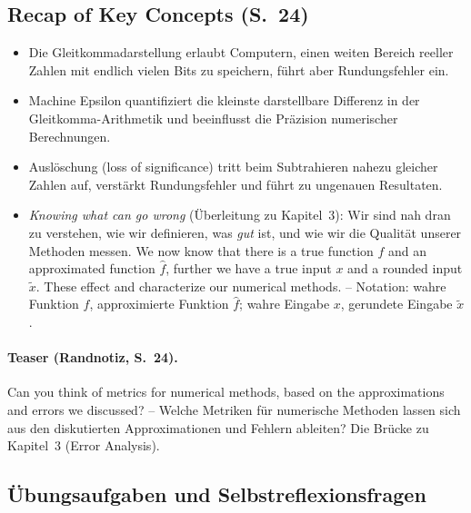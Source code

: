 \subsection{Recap of Key Concepts (S.~24)}

\begin{itemize}[itemsep=1pt]
  \item Die Gleitkommadarstellung erlaubt Computern, einen weiten Bereich reeller Zahlen mit endlich vielen Bits zu speichern, führt aber Rundungsfehler ein.
  \item Machine Epsilon quantifiziert die kleinste darstellbare Differenz in der Gleitkomma-Arithmetik und beeinflusst die Präzision numerischer Berechnungen.
  \item Auslöschung (loss of significance) tritt beim Subtrahieren nahezu gleicher Zahlen auf, verstärkt Rundungsfehler und führt zu ungenauen Resultaten.
  \item \emph{Knowing what can go wrong} (Überleitung zu Kapitel~3): Wir sind nah dran zu verstehen, wie wir definieren, was \emph{gut} ist, und wie wir die Qualität unserer Methoden messen. \glqq We now know that there is a true function $f$ and an approximated function $\hat{f}$, further we have a true input $x$ and a rounded input $\tilde{x}$. These effect and characterize our numerical methods.\grqq{} -- Notation: wahre Funktion $f$, approximierte Funktion $\hat{f}$; wahre Eingabe $x$, gerundete Eingabe $\tilde{x}$.
\end{itemize}

\paragraph{Teaser (Randnotiz, S.~24).} \glqq Can you think of metrics for numerical methods, based on the approximations and errors we discussed?\grqq{} -- Welche Metriken für numerische Methoden lassen sich aus den diskutierten Approximationen und Fehlern ableiten? Die Brücke zu Kapitel~3 (Error Analysis).

\subsection{Übungsaufgaben und Selbstreflexionsfragen}

